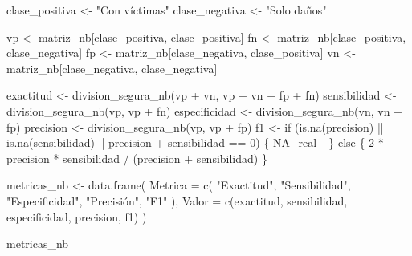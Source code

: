 \documentclass[
  spanish,
  10.5pt,
  letterpaper,
  openany,
  headings=big]{scrbook}
\newenvironment{Shaded}{}{}
\newcommand{\AttributeTok}[1]{\textcolor[rgb]{0.84,0.23,0.29}{#1}}
\newcommand{\ConstantTok}[1]{\textcolor[rgb]{0.00,0.36,0.77}{#1}}
\newcommand{\ControlFlowTok}[1]{\textcolor[rgb]{0.84,0.23,0.29}{#1}}
\newcommand{\DecValTok}[1]{\textcolor[rgb]{0.00,0.36,0.77}{#1}}
\newcommand{\FunctionTok}[1]{\textcolor[rgb]{0.44,0.26,0.76}{#1}}
\newcommand{\NormalTok}[1]{\textcolor[rgb]{0.14,0.16,0.18}{#1}}
\newcommand{\OtherTok}[1]{\textcolor[rgb]{0.44,0.26,0.76}{#1}}
\newcommand{\SpecialCharTok}[1]{\textcolor[rgb]{0.00,0.36,0.77}{#1}}
\newcommand{\StringTok}[1]{\textcolor[rgb]{0.01,0.18,0.38}{#1}}
\begin{document}
\begin{Shaded}
\begin{Highlighting}[]
\NormalTok{clase\_positiva }\OtherTok{\textless{}{-}} \StringTok{"Con víctimas"}
\NormalTok{clase\_negativa }\OtherTok{\textless{}{-}} \StringTok{"Solo daños"}

\NormalTok{vp }\OtherTok{\textless{}{-}}\NormalTok{ matriz\_nb[clase\_positiva, clase\_positiva]}
\NormalTok{fn }\OtherTok{\textless{}{-}}\NormalTok{ matriz\_nb[clase\_positiva, clase\_negativa]}
\NormalTok{fp }\OtherTok{\textless{}{-}}\NormalTok{ matriz\_nb[clase\_negativa, clase\_positiva]}
\NormalTok{vn }\OtherTok{\textless{}{-}}\NormalTok{ matriz\_nb[clase\_negativa, clase\_negativa]}

\NormalTok{exactitud }\OtherTok{\textless{}{-}} \FunctionTok{division\_segura\_nb}\NormalTok{(vp }\SpecialCharTok{+}\NormalTok{ vn, vp }\SpecialCharTok{+}\NormalTok{ vn }\SpecialCharTok{+}\NormalTok{ fp }\SpecialCharTok{+}\NormalTok{ fn)}
\NormalTok{sensibilidad }\OtherTok{\textless{}{-}} \FunctionTok{division\_segura\_nb}\NormalTok{(vp, vp }\SpecialCharTok{+}\NormalTok{ fn)}
\NormalTok{especificidad }\OtherTok{\textless{}{-}} \FunctionTok{division\_segura\_nb}\NormalTok{(vn, vn }\SpecialCharTok{+}\NormalTok{ fp)}
\NormalTok{precision }\OtherTok{\textless{}{-}} \FunctionTok{division\_segura\_nb}\NormalTok{(vp, vp }\SpecialCharTok{+}\NormalTok{ fp)}
\NormalTok{f1 }\OtherTok{\textless{}{-}} \ControlFlowTok{if}\NormalTok{ (}\FunctionTok{is.na}\NormalTok{(precision) }\SpecialCharTok{||} \FunctionTok{is.na}\NormalTok{(sensibilidad) }\SpecialCharTok{||}
\NormalTok{          precision }\SpecialCharTok{+}\NormalTok{ sensibilidad }\SpecialCharTok{==} \DecValTok{0}\NormalTok{) \{}
  \ConstantTok{NA\_real\_}
\NormalTok{\} }\ControlFlowTok{else}\NormalTok{ \{}
  \DecValTok{2} \SpecialCharTok{*}\NormalTok{ precision }\SpecialCharTok{*}\NormalTok{ sensibilidad }\SpecialCharTok{/}\NormalTok{ (precision }\SpecialCharTok{+}\NormalTok{ sensibilidad)}
\NormalTok{\}}

\NormalTok{metricas\_nb }\OtherTok{\textless{}{-}} \FunctionTok{data.frame}\NormalTok{(}
  \AttributeTok{Metrica =} \FunctionTok{c}\NormalTok{(}
    \StringTok{"Exactitud"}\NormalTok{, }\StringTok{"Sensibilidad"}\NormalTok{, }\StringTok{"Especificidad"}\NormalTok{, }\StringTok{"Precisión"}\NormalTok{, }\StringTok{"F1"}
\NormalTok{  ),}
  \AttributeTok{Valor =} \FunctionTok{c}\NormalTok{(exactitud, sensibilidad, especificidad, precision, f1)}
\NormalTok{)}

\NormalTok{metricas\_nb}
\end{Highlighting}
\end{Shaded}
\end{document}
